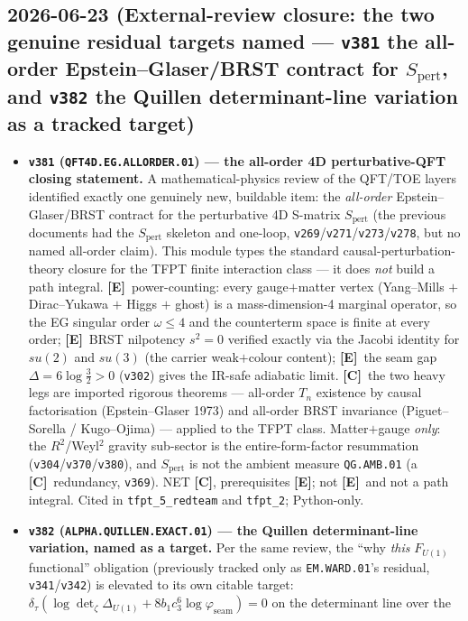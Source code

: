 \documentclass[11pt]{article}
\providecommand{\mE}{\textbf{[E]}}\providecommand{\mC}{\textbf{[C]}}
\providecommand{\vref}[1]{\texttt{#1}}
\providecommand{\cthree}{c_3}\providecommand{\phiz}{\varphi_0^{\mathrm{ret}}}
\begin{document}
\subsection*{2026-06-23 (External-review closure: the two genuine residual targets named --- \texttt{v381} the all-order Epstein--Glaser/BRST contract for $S_{\mathrm{pert}}$, and \texttt{v382} the Quillen determinant-line variation as a tracked target)}
\begin{itemize}
\item \textbf{\texttt{v381} (\texttt{QFT4D.EG.ALLORDER.01}) --- the all-order 4D perturbative-QFT closing statement.}
A mathematical-physics review of the QFT/TOE layers identified exactly one genuinely new, buildable item: the
\emph{all-order} Epstein--Glaser/BRST contract for the perturbative 4D S-matrix $S_{\mathrm{pert}}$ (the previous
documents had the $S_{\mathrm{pert}}$ skeleton and one-loop, \vref{v269}/\vref{v271}/\vref{v273}/\vref{v278}, but no
named all-order claim). This module types the standard causal-perturbation-theory closure for the TFPT finite
interaction class --- it does \emph{not} build a path integral. \mE\ power-counting: every gauge$+$matter vertex
(Yang--Mills $+$ Dirac--Yukawa $+$ Higgs $+$ ghost) is a mass-dimension-4 marginal operator, so the EG singular
order $\omega\le4$ and the counterterm space is finite at every order; \mE\ BRST nilpotency $s^2{=}0$ verified
exactly via the Jacobi identity for $su(2)$ and $su(3)$ (the carrier weak$+$colour content); \mE\ the seam gap
$\Delta=6\log\tfrac32>0$ (\vref{v302}) gives the IR-safe adiabatic limit. \mC\ the two heavy legs are imported
rigorous theorems --- all-order $T_n$ existence by causal factorisation (Epstein--Glaser 1973) and all-order BRST
invariance (Piguet--Sorella / Kugo--Ojima) --- applied to the TFPT class. Matter$+$gauge \emph{only}: the
$R^2$/Weyl$^2$ gravity sub-sector is the entire-form-factor resummation (\vref{v304}/\vref{v370}/\vref{v380}), and
$S_{\mathrm{pert}}$ is not the ambient measure \texttt{QG.AMB.01} (a \mC\ redundancy, \vref{v369}). NET \mC,
prerequisites \mE; not \mE\ and not a path integral. Cited in \texttt{tfpt\_5\_redteam} and \texttt{tfpt\_2}; Python-only.
\item \textbf{\texttt{v382} (\texttt{ALPHA.QUILLEN.EXACT.01}) --- the Quillen determinant-line variation, named as a target.}
Per the same review, the ``why \emph{this} $F_{U(1)}$ functional'' obligation (previously tracked only as
\texttt{EM.WARD.01}'s residual, \vref{v341}/\vref{v342}) is elevated to its own citable target:
$\delta_\tau(\log\det_\zeta\Delta_{U(1)}+8b_1\cthree^6\log\varphi_{\mathrm{seam}})=0$ on the determinant line over the

\end{itemize}
\end{document}
